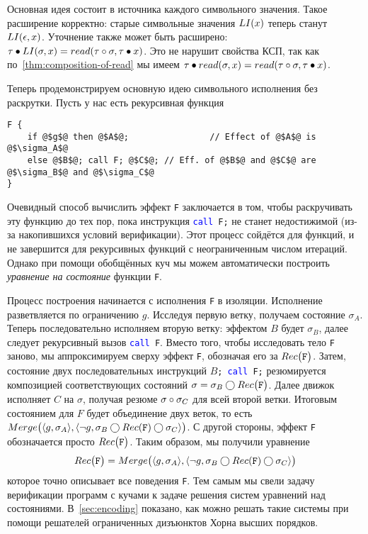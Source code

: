 %
Основная идея состоит в  источника каждого символьного значения. Такое расширение корректно: старые символьные значения $LI(x)$ теперь станут $LI(\epsilon, x)$. Уточнение также может быть расширено: $\tau\bullet LI(\sigma, x)=read(\tau\circ\sigma,\tau\bullet x)$. Это не нарушит свойства КСП, так как по~\autoref{thm:composition-of-read} мы имеем $\tau\bullet read(\sigma,x)=read(\tau\circ\sigma,\tau\bullet x)$.

Теперь продемонстрируем основную идею символьного исполнения без раскрутки. Пусть у нас есть рекурсивная функция
%
\begin{lstlisting}[style=demolang]
F {
	if @$g$@ then @$A$@;				// Effect of @$A$@ is @$\sigma_A$@
	else @$B$@; call F; @$C$@; // Eff. of @$B$@ and @$C$@ are @$\sigma_B$@ and @$\sigma_C$@
}
\end{lstlisting}

Очевидный способ вычислить эффект \texttt{F} заключается в том, чтобы раскручивать эту функцию до тех пор, пока инструкция \texttt{\textcolor{blue}{call} F;} не станет недостижимой (из-за накопившихся условий верификации). Этот процесс сойдётся для  функций, и не завершится для рекурсивных функций с неограниченным числом итераций. Однако при помощи обобщённых куч мы можем автоматически построить \emph{уравнение на состояние} функции \texttt{F}.

Процесс построения начинается с исполнения \texttt{F} в изоляции. Исполнение разветвляется по ограничению $g$. Исследуя первую ветку, получаем состояние $\sigma_A$. Теперь последовательно исполняем вторую ветку: эффектом $B$ будет $\sigma_B$, далее следует рекурсивный вызов \texttt{\textcolor{blue}{call} F}. Вместо того, чтобы исследовать тело \texttt{F} заново, мы аппроксимируем сверху эффект \texttt{F}, обозначая его за $Rec\big(\texttt{F}\big)$. Затем, состояние двух последовательных инструкций \texttt{$B$; \textcolor{blue}{call} F;} резюмируется композицией соответствующих состояний $\sigma = \sigma_B\bigcirc Rec\big(\texttt{F}\big)$. Далее движок исполняет $C$ на $\sigma$, получая резюме $\sigma\circ\sigma_C$ для всей второй ветки. Итоговым состоянием для $F$ будет объединение двух веток, то есть $Merge\big(\langle g, \sigma_A\rangle, \langle\neg g, \sigma_B\bigcirc Rec(\texttt{F})\bigcirc\sigma_C\rangle\big)$. С другой стороны, эффект \texttt{F} обозначается просто $Rec\big(\texttt{F}\big)$. Таким образом, мы получили уравнение
\begin{align*}
Rec\big(\texttt{F}\big)=Merge\big(\langle g, \sigma_A\rangle, \langle\neg g, \sigma_B\bigcirc Rec(\texttt{F})\bigcirc\sigma_C\rangle\big)
\end{align*}
%
которое точно описывает все поведения \texttt{F}. Тем самым мы свели задачу верификации программ с кучами к задаче решения систем уравнений над состояниями. В~\autoref{sec:encoding} показано, как можно решать такие системы при помощи решателей ограниченных дизъюнктов Хорна высших порядков.

